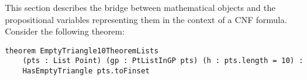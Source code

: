 This section describes the bridge between mathematical objects and the propositional variables representing them in the context of a CNF formula.
Consider the following theorem:

\begin{lstlisting}
theorem EmptyTriangle10TheoremLists
    (pts : List Point) (gp : PtListInGP pts) (h : pts.length = 10) :
    HasEmptyTriangle pts.toFinset
\end{lstlisting}









